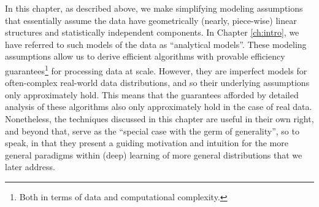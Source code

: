 \documentclass[\toplevelprefix/book-main.tex]{subfiles}
\begin{document}
In this chapter, as described above, we make simplifying modeling assumptions that essentially assume the data have geometrically (nearly, piece-wise) linear structures and statistically independent components. In Chapter \ref{ch:intro}, we have referred to such models of the data as ``analytical models''. These modeling assumptions allow us to derive efficient algorithms with provable efficiency guarantees\footnote{Both in terms of data and computational complexity.} for processing data at scale. However, they are imperfect models for often-complex real-world data distributions, and so their underlying assumptions only approximately hold. This means that the guarantees afforded by detailed analysis of these algorithms also only approximately hold in the case of real data. Nonetheless, the techniques discussed in this chapter are useful in their own right, and beyond that, serve as the ``special case with the germ of generality'', so to speak, in that they present a guiding motivation and intuition for the more general paradigms within (deep)  learning of more general distributions that we later address. %



\end{document}
